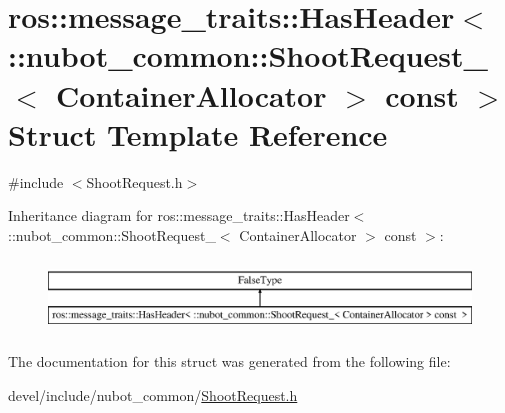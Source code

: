 \hypertarget{structros_1_1message__traits_1_1HasHeader_3_01_1_1nubot__common_1_1ShootRequest___3_01ContainerAllocator_01_4_01const_01_01_4}{\section{ros\-:\-:message\-\_\-traits\-:\-:Has\-Header$<$ \-:\-:nubot\-\_\-common\-:\-:Shoot\-Request\-\_\-$<$ Container\-Allocator $>$ const $>$ Struct Template Reference}
\label{structros_1_1message__traits_1_1HasHeader_3_01_1_1nubot__common_1_1ShootRequest___3_01ContainerAllocator_01_4_01const_01_01_4}
}


{\ttfamily \#include $<$Shoot\-Request.\-h$>$}

Inheritance diagram for ros\-:\-:message\-\_\-traits\-:\-:Has\-Header$<$ \-:\-:nubot\-\_\-common\-:\-:Shoot\-Request\-\_\-$<$ Container\-Allocator $>$ const $>$\-:\begin{figure}[H]
\begin{center}
\leavevmode
\includegraphics[height=1.964912cm]{structros_1_1message__traits_1_1HasHeader_3_01_1_1nubot__common_1_1ShootRequest___3_01ContainerAllocator_01_4_01const_01_01_4}
\end{center}
\end{figure}


The documentation for this struct was generated from the following file\-:\begin{DoxyCompactItemize}
\item 
devel/include/nubot\-\_\-common/\hyperlink{ShootRequest_8h}{Shoot\-Request.\-h}\end{DoxyCompactItemize}
